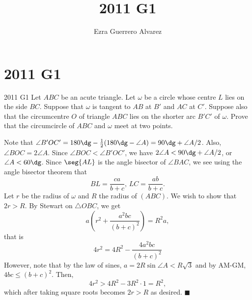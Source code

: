 \documentclass[14pt]{article}
\title{2011 G1}
\author{Ezra Guerrero Alvarez}
\begin{document}
\maketitle
	
\section*{2011 G1}

\begin{statement}{2011 G1}
	Let $ABC$ be an acute triangle. Let $\omega$ be a circle whose centre $L$ lies on the side $BC$. Suppose that $\omega$ is tangent to $AB$ at $B'$ and $AC$ at $C'$. Suppose also that the circumcentre $O$ of triangle $ABC$ lies on the shorter arc $B'C'$ of $\omega$. Prove that the circumcircle of $ABC$ and $\omega$ meet at two points.
\end{statement}
Note that $\angle B'OC'=180\dg-\frac12(180\dg-\angle A)=90\dg+\angle A/2$. Also, $\angle BOC = 2\angle A$. Since $\angle BOC<\angle B'OC'$, we have $2\angle A<90\dg+\angle A/2$, or $\angle A <60\dg$. Since $\seg{AL}$ is the angle bisector of $\angle BAC$, we see using the angle bisector theorem that
\[ BL=\frac{ca}{b+c},\, LC=\frac{ab}{b+c}. \]
Let $r$ be the radius of $\omega$ and $R$ the radius of $(ABC)$. We wish to show that $2r>R$. By Stewart on $\triangle OBC$, we get
\[ a\left(r^2+\frac{a^2bc}{(b+c)^2}\right)=R^2a, \]
that is
\[ 4r^2=4R^2-\frac{4a^2bc}{(b+c)^2} \]
However, note that by the law of sines, $a=2R\sin\angle A<R\sqrt3$ and by AM-GM, $4bc\le(b+c)^2$. Then,
\[ 4r^2>4R^2-3R^2\cdot1=R^2, \]
which after taking square roots becomes $2r>R$ as desired. $\blacksquare$
	
\end{document}
